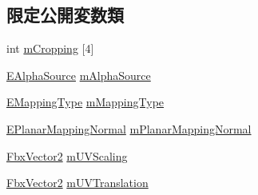 \subsection*{限定公開変数類}
\begin{DoxyCompactItemize}
\item 
int \hyperlink{class_fbx_texture_abba1ab39aa33baa722b9707363d80b44}{m\+Cropping} \mbox{[}4\mbox{]}
\item 
\hyperlink{class_fbx_texture_a12777ea406718d186e21b9656716171d}{E\+Alpha\+Source} \hyperlink{class_fbx_texture_a2d708745702a77f5f47e6d65763923fb}{m\+Alpha\+Source}
\item 
\hyperlink{class_fbx_texture_afdf9b65a25dfe5bdcef820f0fc1f5b34}{E\+Mapping\+Type} \hyperlink{class_fbx_texture_aed526c6181680a2b7da6eae7c8723a6d}{m\+Mapping\+Type}
\item 
\hyperlink{class_fbx_texture_a6115b6970e4c83198112530d1e6f578c}{E\+Planar\+Mapping\+Normal} \hyperlink{class_fbx_texture_a5c9ac7b29bd18735d46d681cc2031e2a}{m\+Planar\+Mapping\+Normal}
\item 
\hyperlink{class_fbx_vector2}{Fbx\+Vector2} \hyperlink{class_fbx_texture_a44b35867b77a61b184302c508b2249a5}{m\+U\+V\+Scaling}
\item 
\hyperlink{class_fbx_vector2}{Fbx\+Vector2} \hyperlink{class_fbx_texture_a7465889be9ff81770ca74471bd86f94d}{m\+U\+V\+Translation}
\end{DoxyCompactItemize}
